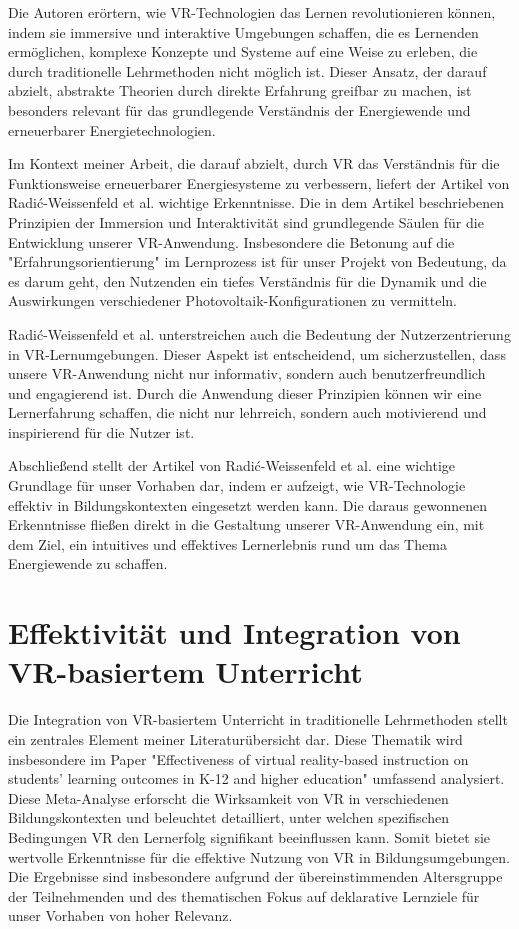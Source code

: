 \documentclass[draft,final]{vutinfth} %
\begin{document}
Die Autoren erörtern, wie VR-Technologien das Lernen revolutionieren können, indem sie immersive und interaktive Umgebungen schaffen, die es Lernenden ermöglichen, komplexe Konzepte und Systeme auf eine Weise zu erleben, die durch traditionelle Lehrmethoden nicht möglich ist. Dieser Ansatz, der darauf abzielt, abstrakte Theorien durch direkte Erfahrung greifbar zu machen, ist besonders relevant für das grundlegende Verständnis der Energiewende und erneuerbarer Energietechnologien.

Im Kontext meiner Arbeit, die darauf abzielt, durch VR das Verständnis für die Funktionsweise erneuerbarer Energiesysteme zu verbessern, liefert der Artikel von Radić-Weissenfeld et al. wichtige Erkenntnisse. Die in dem Artikel beschriebenen Prinzipien der Immersion und Interaktivität sind grundlegende Säulen für die Entwicklung unserer VR-Anwendung. Insbesondere die Betonung auf die "Erfahrungsorientierung" im Lernprozess ist für unser Projekt von Bedeutung, da es darum geht, den Nutzenden ein tiefes Verständnis für die Dynamik und die Auswirkungen verschiedener Photovoltaik-Konfigurationen zu vermitteln.

Radić-Weissenfeld et al. unterstreichen auch die Bedeutung der Nutzerzentrierung in VR-Lernumgebungen. Dieser Aspekt ist entscheidend, um sicherzustellen, dass unsere VR-Anwendung nicht nur informativ, sondern auch benutzerfreundlich und engagierend ist. Durch die Anwendung dieser Prinzipien können wir eine Lernerfahrung schaffen, die nicht nur lehrreich, sondern auch motivierend und inspirierend für die Nutzer ist.

Abschließend stellt der Artikel von Radić-Weissenfeld et al. eine wichtige Grundlage für unser Vorhaben dar, indem er aufzeigt, wie VR-Technologie effektiv in Bildungskontexten eingesetzt werden kann. Die daraus gewonnenen Erkenntnisse fließen direkt in die Gestaltung unserer VR-Anwendung ein, mit dem Ziel, ein intuitives und effektives Lernerlebnis rund um das Thema Energiewende zu schaffen.

\section{Effektivität und Integration von VR-basiertem Unterricht}

Die Integration von VR-basiertem Unterricht in traditionelle Lehrmethoden stellt ein zentrales Element meiner Literaturübersicht dar. Diese Thematik wird insbesondere im Paper "Effectiveness of virtual reality-based instruction on students' learning outcomes in K-12 and higher education" umfassend analysiert. Diese Meta-Analyse erforscht die Wirksamkeit von VR in verschiedenen Bildungskontexten und beleuchtet detailliert, unter welchen spezifischen Bedingungen VR den Lernerfolg signifikant beeinflussen kann. Somit bietet sie wertvolle Erkenntnisse für die effektive Nutzung von VR in Bildungsumgebungen. Die Ergebnisse sind insbesondere aufgrund der übereinstimmenden Altersgruppe der Teilnehmenden und des thematischen Fokus auf deklarative Lernziele für unser Vorhaben von hoher Relevanz.
\end{document}
